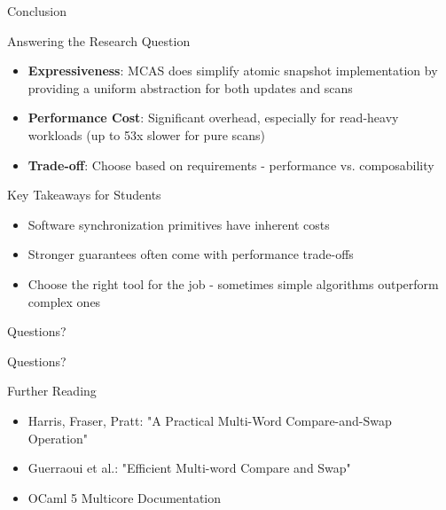 \documentclass[aspectratio=169]{beamer}
\begin{document}
\begin{frame}{Conclusion}
    \begin{block}{Answering the Research Question}
        \begin{itemize}
            \item \textbf{Expressiveness}: MCAS does simplify atomic snapshot implementation by providing a uniform abstraction for both updates and scans
            \item \textbf{Performance Cost}: Significant overhead, especially for read-heavy workloads (up to 53x slower for pure scans)
            \item \textbf{Trade-off}: Choose based on requirements - performance vs. composability
        \end{itemize}
    \end{block}

    \vspace{0.3cm}

    \begin{block}{Key Takeaways for Students}
        \begin{itemize}
            \item Software synchronization primitives have inherent costs
            \item Stronger guarantees often come with performance trade-offs
            \item Choose the right tool for the job - sometimes simple algorithms outperform complex ones
        \end{itemize}
    \end{block}
\end{frame}

\begin{frame}{Questions?}
    \begin{center}
        \Huge Questions?
    \end{center}

    \vspace{0.5cm}

    \begin{block}{Further Reading}
        \begin{itemize}
            \item Harris, Fraser, Pratt: "A Practical Multi-Word Compare-and-Swap Operation"
            \item Guerraoui et al.: "Efficient Multi-word Compare and Swap"
            \item OCaml 5 Multicore Documentation
        \end{itemize}
    \end{block}
\end{frame}
\end{document}
